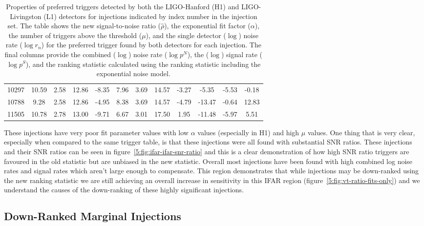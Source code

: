 \begin{table}[ht]
\begin{tabular}{lccccccccccc}
        10297 & 10.59 & 2.58 & 12.86 & -8.35 & 7.96 & 3.69 & 14.57 & -3.27 & -5.35 & -5.53 & -0.18 \\
        10788 & 9.28 & 2.58 & 12.86 & -4.95 & 8.38 & 3.69 & 14.57 & -4.79 & -13.47 & -0.64 & 12.83 \\
        11505 & 10.78 & 2.78 & 13.00 & -9.71 & 6.67 & 3.01 & 17.50 & 1.95 & -11.48 & -5.97 & 5.51 \\
        \bottomrule
    \end{tabular}
    \caption{Properties of preferred triggers detected by both the LIGO-Hanford (H1) and LIGO-Livingston (L1) detectors for injections indicated by index number in the injection set. The table shows the new signal-to-noise ratio ($\hat{\rho}$), the exponential fit factor ($\alpha$), the number of triggers above the threshold ($\mu$), and the single detector ($\log$) noise rate ($\log r_n$) for the preferred trigger found by both detectors for each injection. The final columns provide the combined ($\log$) noise rate ($\log p^{N}$), the ($\log$) signal rate ($\log p^{S}$), and the ranking statistic calculated using the ranking statistic including the exponential noise model.}
    \label{5:tab:top-right-diff-temp-fits}
\end{table}
%
These injections have very poor fit parameter values with low $\alpha$ values (especially in H1) and high $\mu$ values. One thing that is very clear, especially when compared to the same trigger table, is that these injections were all found with substantial SNR ratios. These injections and their SNR ratios can be seen in figure~\ref{5:fig:ifar-ifar-snr-ratio} and this is a clear demonstration of how high SNR ratio triggers are favoured in the old statistic but are unbiased in the new statistic. Overall most injections have been found with high combined log noise rates and signal rates which aren't large enough to compensate. This region demonstrates that while injections may be down-ranked using the new ranking statistic we are still achieving an overall increase in sensitivity in this IFAR region (figure~\ref{5:fig:vt-ratio-fits-only}) and we understand the causes of the down-ranking of these highly significant injections.


\subsection{\label{5:sec:middle-region}Down-Ranked Marginal Injections}

